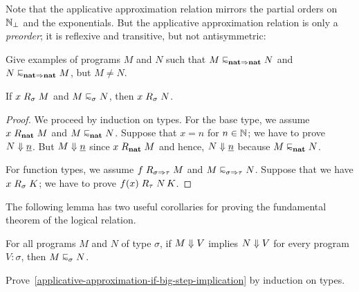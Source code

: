 Note that the applicative approximation relation mirrors the partial orders on
\(\mathbb N_\bot\) and the exponentials.
%
But the applicative approximation relation is only a \emph{preorder}; it is
reflexive and transitive, but not antisymmetric:

\begin{exercise}\label{exer:applicative-approximation-not-antisymmetric}
  Give examples of programs \(M\) and \(N\) such that
  \(M \appapprox_{\pcfnat \pcffun \pcfnat} N\) and
  \(N \appapprox_{\pcfnat \pcffun \pcfnat} M\), but \(M \neq N\).
\end{exercise}

\begin{lemma}\label{R-extend-right}
  If \(x \mathrel{R}_\sigma M\) and \(M \appapprox_\sigma N\), then
  \(x \mathrel{R}_\sigma N\).
\end{lemma}
\begin{proof}
  We proceed by induction on types.
  For the base type, we assume \(x \mathrel{R}_\mathtt{\mathbf{nat}} M\) and
  \(M \appapprox_\pcfnat N\). Suppose that \(x = n\) for \(n \in \mathbb N\); we have
  to prove \(N \Downarrow \underline{n}\). But \(M \Downarrow \underline{n}\) since
  \(x \mathrel{R}_\mathtt{\mathbf{nat}} M\) and hence, \(N \Downarrow \underline{n}\) because
  \(M \appapprox_\pcfnat N\).

  For function types, we assume \(f \mathrel{R}_{\sigma \Rightarrow \tau} M\) and
  \(M \appapprox_{\sigma \pcffun \tau} N\). Suppose that we have
  \(x \mathrel{R}_\sigma K\); we have to prove \(f(x) \mathrel{R}_\tau N \, K\).
\end{proof}

The following lemma has two useful corollaries for proving the fundamental
theorem of the logical relation.
\begin{lemma}\label{applicative-approximation-if-big-step-implication}
  For all programs \(M\) and \(N\) of type \(\sigma\), if \(M \Downarrow V\)
  implies \(N \Downarrow V\) for every program \(V : \sigma\), then
  \(M \appapprox_\sigma N\).
\end{lemma}

\begin{exercise}\label{exer:applicative-approximation-if-big-step-implication}
  Prove~\cref{applicative-approximation-if-big-step-implication} by induction on
  types.
\end{exercise}



\begin{corollary}

\end{corollary}

